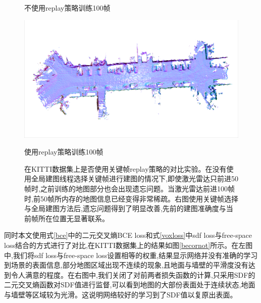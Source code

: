 \begin{figure}[htbp]
\begin{minipage}{0.5\linewidth}
        \caption*{不使用replay策略训练100帧}
	\end{minipage}\hfill
	\begin{minipage}{0.5\linewidth}
		\centering
		\includegraphics[width=1\linewidth]{figures/100o.png}
        \caption*{使用replay策略训练100帧}
	\end{minipage}
    \caption{在KITTI数据集上是否使用关键帧replay策略的对比实验。在没有使用全局建图线程选择关键帧进行建图的情况下,即使激光雷达只前进50帧时,之前训练的地图部分也会出现遗忘问题。当激光雷达前进100帧时,前50帧所内存的地图信息已经变得非常稀疏。右图使用关键帧选择与全局建图方法后,遗忘问题得到了明显改善,先前的建图准确度与当前帧所在位置无显著联系。}\label{replay}
\end{figure}

同时本文使用式\ref{bce}中的二元交叉熵BCE loss和式\ref{voxloss}中sdf loss与free-space loss结合的方式进行了对比,在KITTI数据集上的结果如图\ref{becornot}所示。在左图中,我们将sdf loss与free-space loss设置相等的权重,结果显示网络并没有准确的学习到场景的表面信息,部分地图区域出现不连续的现象,且地面与墙壁的平滑度没有达到令人满意的程度。在右图中,我们关闭了对前两者损失函数的计算,只采用SDF的二元交叉熵函数对SDF值进行监督,可以看到地图的大部份表面处于连续状态,地面与墙壁等区域较为光滑。这说明网络较好的学习到了SDF值以复原出表面。

